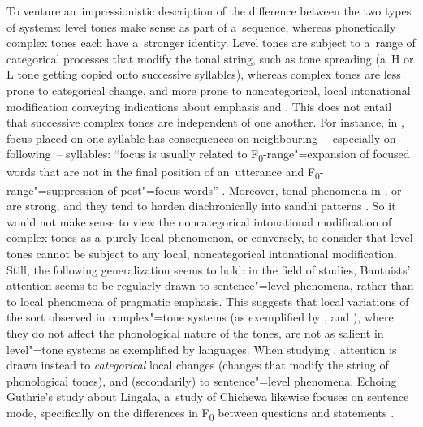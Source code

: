 To venture an~impressionistic description of the difference between the two types of systems: level tones make sense as part of a~sequence, whereas phonetically complex tones each have a~stronger identity. Level tones are subject to a~range of categorical processes that modify the tonal string, such as tone spreading (a~H or L tone getting copied onto successive syllables), whereas complex tones are less prone to categorical change, and more prone to noncategorical, local intonational modification conveying indications about emphasis and . This does not entail that successive complex tones are independent of one another. For instance, in , focus placed on one syllable has consequences on neighbouring~-- especially on following~-- syllables: “focus is usually related to F\textsubscript{0}-range"=expansion of focused words that are not in the final position of an~utterance and F\textsubscript{0}-range"=suppression of post"=focus words'' \citep[449]{zhangetal2004}. Moreover, tonal  phenomena in ,  or  are strong, and they tend to harden diachronically into sandhi patterns \citep{abramson1979a, gandouretal1992, brunelle2003, brunelle2009b, zhangetal2011}. So it would not make sense to view the noncategorical intonational modification of complex tones as a~purely local phenomenon, or conversely, to consider that level tones cannot be subject to any local, noncategorical intonational modification. Still, the following generalization seems to hold: in the field of  studies, Bantuists' attention seems to be regularly drawn to sentence"=level phenomena, rather than to local phenomena of pragmatic emphasis. This suggests that local variations of the sort observed in complex"=tone systems (as exemplified by ,  and ), where they do not affect the phonological nature of the tones, are not as salient in level"=tone systems as exemplified by  languages. When studying  , attention is drawn instead to \textit{categorical} local changes (changes that modify the string of phonological tones), and (secondarily) to sentence"=level phenomena. Echoing Guthrie's study about Lingala, a~study of Chichewa  likewise focuses on sentence mode, specifically on the differences in F\textsubscript{0} between questions and statements \citep{myers1996}.

